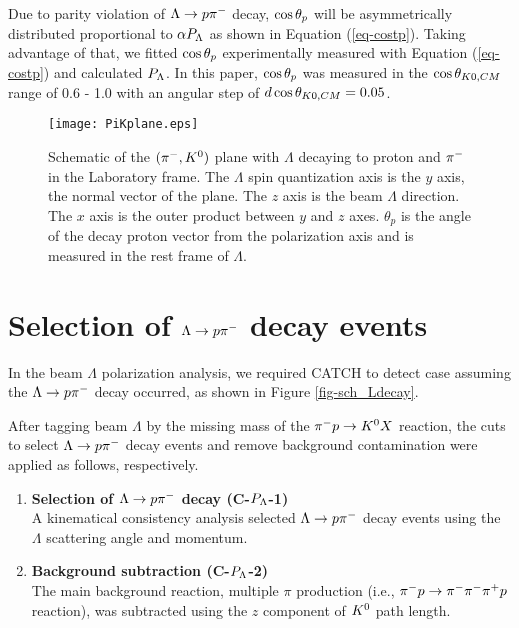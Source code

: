 Due to parity violation of $\Lambda\to p\pi^{-}$ decay, $\cos{\theta_p}$ will be asymmetrically distributed proportional to $\alpha P_{\Lambda}$ \cite{Lee1957} as shown in Equation (\ref{eq-costp}). Taking advantage of that, we fitted $\cos{\theta_p}$ experimentally measured with Equation (\ref{eq-costp}) and calculated $P_{\Lambda}$. In this paper, $\cos{\theta_p}$ was measured in the $\cos{\theta_{K0,CM}}$ range of 0.6 - 1.0 with an angular step of $d\cos{\theta_{K0,CM}} = 0.05$.


\begin{figure}[h]
  \centering
  \texttt{[image: PiKplane.eps]}
  \caption{Schematic of the $(\pi^-,K^0)$ plane with $\Lambda$ decaying to proton and $\pi^{-}$ in the Laboratory frame. The $\Lambda$ spin quantization axis is the $y$ axis, the normal vector of the plane. The $z$ axis is the beam $\Lambda$ direction. The $x$ axis is the outer product between $y$ and $z$ axes. $\theta_p$ is the angle of the decay proton vector from the polarization axis and is measured in the rest frame of $\Lambda$.}
  \label{fig-PiKplane}
\end{figure}


\clearpage
\section{Selection of $\Lambda\to p\pi^{-}$ decay events}
\label{sec-Pl-evsele}

In the beam $\Lambda$ polarization analysis, we required CATCH to detect case  assuming the $\Lambda\to p\pi^{-}$ decay occurred, as shown in Figure \ref{fig-sch_Ldecay}.  %

After tagging beam $\Lambda$ by the missing mass of the $\pi^- p \to K^0 X$ reaction, the cuts to select $\Lambda\to p\pi^{-}$ decay events and remove background contamination were applied as follows, respectively. 


\begin{enumerate}
  \item {\bf Selection of $\Lambda\to p\pi^{-}$ decay ({\bf C-$P_{\Lambda}$-1}) } \\
  A kinematical consistency analysis selected $\Lambda\to p\pi^{-}$ decay events using the $\Lambda$ scattering angle and momentum.
  \item {\bf Background subtraction ({\bf C-$P_{\Lambda}$-2}) } \\
  The main background reaction, multiple $\pi$ production (i.e., $\pi^- p \to \pi^-\pi^-\pi^+p$ reaction), was subtracted using the $z$ component of $K^{0}$ path length. 
\end{enumerate}

